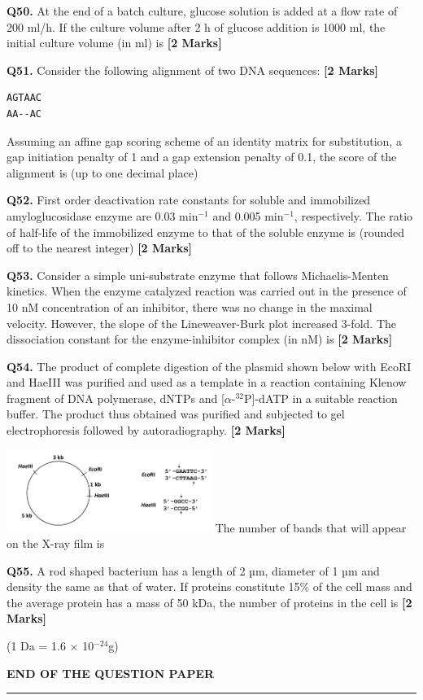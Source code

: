\documentclass[11pt]{article}
\newcommand{\questionb}[2]{
    \noindent\textbf{Q#2.} #1 \hfill \textbf{[2 Marks]}
}
\begin{document}
\questionb{At the end of a batch culture, glucose solution is added at a flow rate of 200 ml/h. If the culture volume after 2 h of glucose addition is 1000 ml, the initial culture volume (in ml) is}{50}
\vspace{0.5cm}

\questionb{Consider the following alignment of two DNA sequences:}{51}
\begin{verbatim}
AGTAAC
AA--AC
\end{verbatim}
Assuming an affine gap scoring scheme of an identity matrix for substitution, a gap initiation penalty of 1 and a gap extension penalty of 0.1, the score of the alignment is (up to one decimal place)
\vspace{0.5cm}

\questionb{First order deactivation rate constants for soluble and immobilized amyloglucosidase enzyme are 0.03 min\(^{-1}\) and 0.005 min\(^{-1}\), respectively. The ratio of half-life of the immobilized enzyme to that of the soluble enzyme is (rounded off to the nearest integer)}{52}
\vspace{0.5cm}

\questionb{Consider a simple uni-substrate enzyme that follows Michaelis-Menten kinetics. When the enzyme catalyzed reaction was carried out in the presence of 10 nM concentration of an inhibitor, there was no change in the maximal velocity. However, the slope of the Lineweaver-Burk plot increased 3-fold. The dissociation constant for the enzyme-inhibitor complex (in nM) is}{53}
\vspace{0.5cm}

\questionb{The product of complete digestion of the plasmid shown below with EcoRI and HaeIII was purified and used as a template in a reaction containing Klenow fragment of DNA polymerase, dNTPs and [$\alpha$-\(^{32}\)P]-dATP in a suitable reaction buffer. The product thus obtained was purified and subjected to gel electrophoresis followed by autoradiography.}{54}
\includegraphics[width=0.5\textwidth]{figures/Q54}
The number of bands that will appear on the X-ray film is
\vspace{0.5cm}

\questionb{A rod shaped bacterium has a length of 2 µm, diameter of 1 µm and density the same as that of water. If proteins constitute 15\% of the cell mass and the average protein has a mass of 50 kDa, the number of proteins in the cell is}{55}
(1 Da = 1.6 × 10\(^{-24}\)g)
\vspace{1cm}

\begin{center}
\textbf{END OF THE QUESTION PAPER}
\rule{\textwidth}{0.5pt} 
\end{center}
\end{document}
